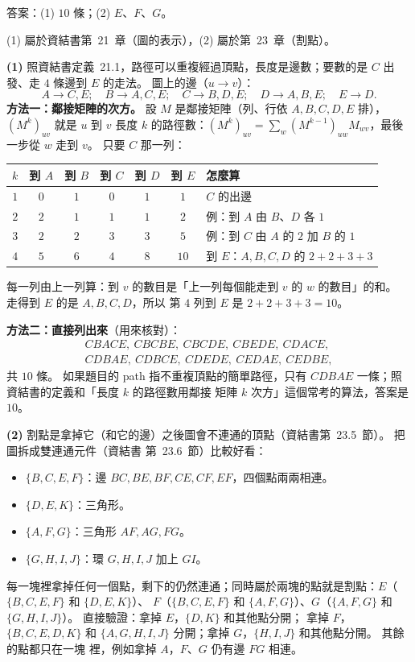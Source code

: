 \begin{pastsoln}
答案：(1) $10$ 條；(2) $E$、$F$、$G$。

(1) 屬於資結書第~21~章（圖的表示），(2) 屬於第~23~章（割點）。

\textbf{(1)} 照資結書定義~21.1，路徑可以重複經過頂點，長度是邊數；要數的是 $C$ 出發、走 $4$ 條邊到 $E$ 的走法。
圖上的邊（$u \to v$）：
\[
A \to C, E;\quad B \to A, C, E;\quad C \to B, D, E;\quad D \to A, B, E;\quad E \to D.
\]
\textbf{方法一：鄰接矩陣的次方。} 設 $M$ 是鄰接矩陣（列、行依 $A, B, C, D, E$ 排），$(M^k)_{uv}$ 就是 $u$ 到 $v$
長度 $k$ 的路徑數：$(M^{k})_{uv} = \sum_w (M^{k-1})_{uw} M_{wv}$，最後一步從 $w$ 走到 $v$。 只要 $C$ 那一列：
\begin{center}
\begin{tabular}{ccccccl}
\toprule
$k$ & 到 $A$ & 到 $B$ & 到 $C$ & 到 $D$ & 到 $E$ & 怎麼算 \\
\midrule
$1$ & $0$ & $1$ & $0$ & $1$ & $1$ & $C$ 的出邊 \\
$2$ & $2$ & $1$ & $1$ & $1$ & $2$ & 例：到 $A$ 由 $B$、$D$ 各 $1$ \\
$3$ & $2$ & $2$ & $3$ & $3$ & $5$ & 例：到 $C$ 由 $A$ 的 $2$ 加 $B$ 的 $1$ \\
$4$ & $5$ & $6$ & $4$ & $8$ & $10$ & 到 $E$：$A, B, C, D$ 的 $2 + 2 + 3 + 3$ \\
\bottomrule
\end{tabular}
\end{center}
每一列由上一列算：到 $v$ 的數目是「上一列每個能走到 $v$ 的 $w$ 的數目」的和。 走得到 $E$ 的是 $A, B, C, D$，所以
第 $4$ 列到 $E$ 是 $2 + 2 + 3 + 3 = 10$。

\textbf{方法二：直接列出來}（用來核對）：
\[
\begin{gathered}
CBACE,\ CBCBE,\ CBCDE,\ CBEDE,\ CDACE,\\
CDBAE,\ CDBCE,\ CDEDE,\ CEDAE,\ CEDBE,
\end{gathered}
\]
共 $10$ 條。 如果題目的 path 指不重複頂點的簡單路徑，只有 $CDBAE$ 一條；照資結書的定義和「長度 $k$ 的路徑數用鄰接
矩陣 $k$ 次方」這個常考的算法，答案是 $10$。

\textbf{(2)} 割點是拿掉它（和它的邊）之後圖會不連通的頂點（資結書第~23.5~節）。 把圖拆成雙連通元件（資結書
第~23.6~節）比較好看：
\begin{itemize}
\item $\{B, C, E, F\}$：邊 $BC, BE, BF, CE, CF, EF$，四個點兩兩相連。
\item $\{D, E, K\}$：三角形。
\item $\{A, F, G\}$：三角形 $AF, AG, FG$。
\item $\{G, H, I, J\}$：環 $G, H, I, J$ 加上 $GI$。
\end{itemize}
每一塊裡拿掉任何一個點，剩下的仍然連通；同時屬於兩塊的點就是割點：$E$（$\{B,C,E,F\}$ 和 $\{D,E,K\}$）、
$F$（$\{B,C,E,F\}$ 和 $\{A,F,G\}$）、$G$（$\{A,F,G\}$ 和 $\{G,H,I,J\}$）。 直接驗證：拿掉 $E$，$\{D, K\}$ 和其他點分開；
拿掉 $F$，$\{B, C, E, D, K\}$ 和 $\{A, G, H, I, J\}$ 分開；拿掉 $G$，$\{H, I, J\}$ 和其他點分開。 其餘的點都只在一塊
裡，例如拿掉 $A$，$F$、$G$ 仍有邊 $FG$ 相連。
\end{pastsoln}
